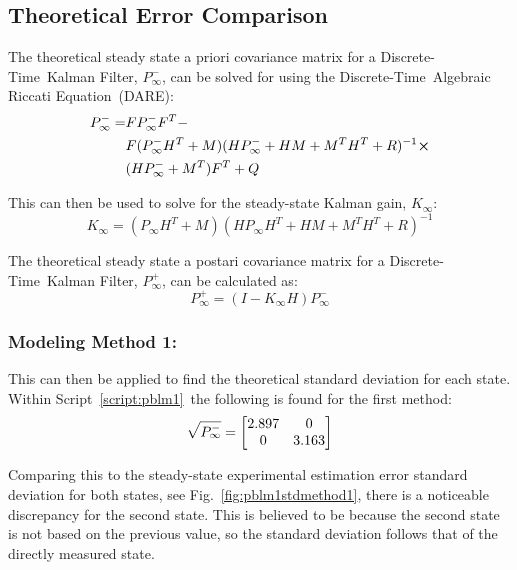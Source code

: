 \documentclass[]{article}
\renewcommand{\lstlistingname}{Script}
\newcommand{\scriptname}{\lstlistingname}
\newcommand{\KF}{Kalman Filter}
\newcommand{\DT}{Discrete-Time}
\newcommand{\DTKF}{\DT \ \KF}
\newcommand{\DARE}{\DT \ Algebraic Riccati Equation}
\renewcommand{\figurename}{Fig.}
\begin{document}
	\newpage
	\subsection{Theoretical Error Comparison}
		The theoretical steady state a priori covariance matrix for a \DTKF, $P_\infty^-$, can be solved for using the \DARE \ (DARE):
		\begin{equation}
			\begin{aligned}
				P_\infty^-= &F P_\infty^- F^T -\\
							&F (P_\infty^- H^T + M)(H P_\infty^- + H M + M^T H^T + R)^{-1} \cross\\
							&(H P_\infty^- + M^T)F^T + Q
			\end{aligned}\label{eq:DARE}
		\end{equation}
		
		This can then be used to solve for the steady-state Kalman gain, $K_\infty$:
		\begin{equation}
			K_\infty = (P_\infty H^T + M)(H P_\infty H^T + H M + M^T H^T + R)^{-1}
		\end{equation}
		
		The theoretical steady state a postari covariance matrix for a \DTKF, $P_\infty^+$, can be calculated as:
		\begin{equation}
			P_\infty^+ = (I - K_\infty H) P_\infty^-
		\end{equation}
		
		\subsubsection{Modeling Method 1:}
			This can then be applied to find the theoretical standard deviation for each state. Within \scriptname \ \ref{script:pblm1}\ the following is found for the first method:
			\begin{equation}
				\sqrt{P_\infty^-} = \mqty[2.897 & 0\\ 0 & 3.163]
			\end{equation}
			
			Comparing this to the steady-state experimental estimation error standard deviation for both states, see \figurename \ \ref{fig:pblm1stdmethod1}, there is a noticeable discrepancy for the second state. This is believed to be because the second state is not based on the previous value, so the standard deviation follows that of the directly measured state.
			
\end{document}

